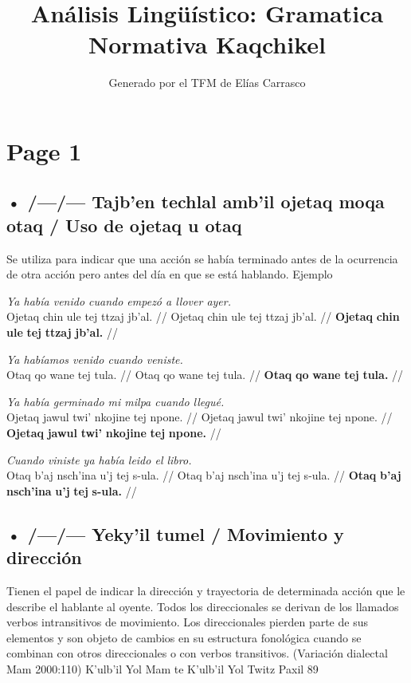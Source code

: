 \documentclass{article}%
\title{Análisis Lingüístico: Gramatica Normativa Kaqchikel}%
\author{Generado por el TFM de Elías Carrasco}%
\begin{document}
%
\normalsize%
\maketitle%
\section{Page 1}%
\label{sec:Page1}%
\subsection{• /—/— Tajb'en techlal amb'il ojetaq moqa otaq / Uso de ojetaq u otaq}%
\label{subsec://Tajbentechlalambilojetaqmoqaotaq/Usodeojetaquotaq}%

%
Se utiliza para indicar que una acción se había terminado antes de la ocurrencia de otra acción pero antes del día en que se está hablando. %
Ejemplo %
\par\medskip%
\ex
\textit{Ya había venido cuando empezó a llover ayer.} \\
\begingl
\gla Ojetaq chin ule tej ttzaj jb'al. //
\glb Ojetaq chin ule tej ttzaj jb'al. //
\glc \textbf{Ojetaq} \textbf{chin} \textbf{ule} \textbf{tej} \textbf{ttzaj} \textbf{jb'al.} //
\endgl
\xe
%
\medskip%
\par\medskip%
\ex
\textit{Ya habíamos venido cuando veniste.} \\
\begingl
\gla Otaq qo wane tej tula. //
\glb Otaq qo wane tej tula. //
\glc \textbf{Otaq} \textbf{qo} \textbf{wane} \textbf{tej} \textbf{tula.} //
\endgl
\xe
%
\medskip%
\par\medskip%
\ex
\textit{Ya había germinado mi milpa cuando llegué.} \\
\begingl
\gla Ojetaq jawul twi' nkojine tej npone. //
\glb Ojetaq jawul twi' nkojine tej npone. //
\glc \textbf{Ojetaq} \textbf{jawul} \textbf{twi'} \textbf{nkojine} \textbf{tej} \textbf{npone.} //
\endgl
\xe
%
\medskip%
\par\medskip%
\ex
\textit{Cuando viniste ya había leido el libro.} \\
\begingl
\gla Otaq b'aj nsch'ina u'j tej s-ula. //
\glb Otaq b'aj nsch'ina u'j tej s-ula. //
\glc \textbf{Otaq} \textbf{b'aj} \textbf{nsch'ina} \textbf{u'j} \textbf{tej} \textbf{s-ula.} //
\endgl
\xe
%
\medskip%
\subsection{• /—/— Yeky'il tumel / Movimiento y dirección}%
\label{subsec://Yekyiltumel/Movimientoydireccin}%

%
Tienen el papel de indicar la dirección y trayectoria de determinada acción que le describe el hablante al oyente. %
Todos los direccionales se derivan de los llamados verbos intransitivos de movimiento. %
Los direccionales pierden parte de sus elementos y son objeto de cambios en su estructura fonológica cuando se combinan con otros direccionales o con verbos transitivos. %
(Variación dialectal Mam 2000:110) %
K'ulb'il Yol Mam te K'ulb'il Yol Twitz Paxil 89 

%
\end{document}
